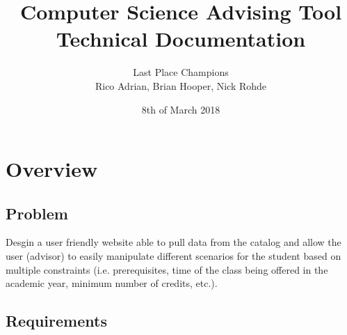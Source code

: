 \documentclass[letterpaper]{report}
\title{Computer Science Advising Tool \\ Technical Documentation}
\author{Last Place Champions \\ Rico Adrian, Brian Hooper, Nick Rohde}
\date{8th of March 2018}
\begin{document}
	\maketitle
	\tableofcontents
	\chapter{Overview}
	\section{Problem}
	Desgin a user friendly website able to pull data from the catalog and allow the user (advisor) to easily manipulate different scenarios for the student based on multiple constraints (i.e. prerequisites, time of the class	being offered in the academic year, minimum number of credits, etc.).
	\section{Requirements}
\end{document}
